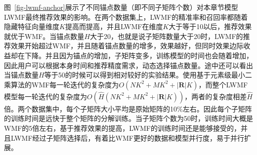图~\ref{fig-lwmf-anchor}展示了不同锚点数量（即不同子矩阵个数）对本章节模型LWMF最终推荐效果的影响。在两个数据集上，LWMF的精准率和召回率都随着隐藏特征向量维度$K$提高而提高，并且LWMF在维度$K$大于等于10以后，推荐效果就优于WMF。当锚点数量$H$大于20，也就是说子矩阵数量大于20时，LWMF的推荐效果开始超过WMF，并且随着锚点数量的增多，效果越好，但同时效果边际收益却在下降。并且因为锚点的增加，子矩阵变多，训练模型的时间也会随着增加，因此用户可以根据本身时间和推荐精度需求，动态选择锚点数量。途中还可以看出当锚点数量$H$等于50的时候可以得到相对较好的实验结果。使用基于元素级最小二乘算法的WMF每一轮迭代的复杂度为$O(NK^2+MK^2+|\mathbf{R}|K)$，而整个LWMF模型每一轮迭代的复杂度为$O(\hat{H}(NK^2+MK^2+|\mathbf{R}|K))$，两者的复杂度相差$\hat{H}$倍。两个数据集中，每个子矩阵大小平均是原始矩阵的10\%左右。因此每个子矩阵的训练时间是远快于整个矩阵的分解训练。当子矩阵个数为50时，训练时间大概是WMF的5倍左右，基于推荐效果的提高，LWMF的训练时间还是能够接受的，并且LWMF经过子矩阵选择后，有着比WMF更好的数据和模型并行度，易于并行扩展。

